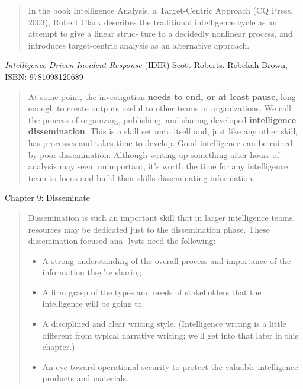 \documentclass[Screen16to9,17pt]{foils}
\begin{document}




\begin{quote}
In the book Intelligence Analysis, a Target-Centric Approach (CQ Press, 2003), Robert
Clark describes the traditional intelligence cycle as an attempt to give a linear struc‐
ture to a decidedly nonlinear process, and introduces target-centric analysis as an
alternative approach.
\end{quote}




\emph{Intelligence-Driven Incident Response} (IDIR)
 Scott Roberts. Rebekah Brown, ISBN: 9781098120689

\begin{quote}
At some point, the investigation {\bf needs to end, or at least pause}, long enough to create outputs useful to other teams or organizations. We call the process of organizing, publishing, and sharing developed {\bf intelligence dissemination}. This is a skill set unto itself and, just like any other skill, has processes and takes time to develop. Good intelligence can be ruined by poor dissemination. Although writing up something after hours of analysis may seem unimportant, it’s worth the time for any intelligence team to focus and build their skills disseminating information.
\end{quote}

\begin{list2}
\item Chapter 9: Disseminate
\end{list2}



\begin{quote}
Dissemination is such an important skill that in larger intelligence teams, resources
may be dedicated just to the dissemination phase. These dissemination-focused ana‐
lysts need the following:
\begin{itemize}
\item A strong understanding of the overall process and importance of the information
they’re sharing.
\item A firm grasp of the types and needs of stakeholders that the intelligence will be
going to.
\item A disciplined and clear writing style. (Intelligence writing is a little different from typical narrative writing; we’ll get into that later in this chapter.)
\item An eye toward operational security to protect the valuable intelligence products
and materials.
\end{itemize}
\end{quote}
\end{document}

